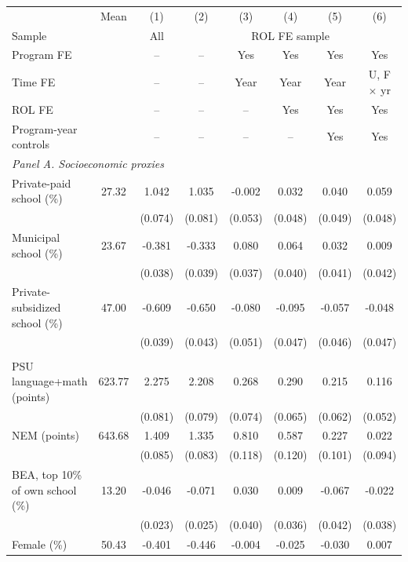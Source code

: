 \begin{tabular}{lc*{6}{c}}
\toprule
 & Mean & (1) & (2) & (3) & (4) & (5) & (6) \\
Sample & & All & \multicolumn{5}{c}{ROL FE sample} \\
Program FE & & -- & -- & Yes & Yes & Yes & Yes \\
Time FE & & -- & -- & Year & Year & Year & U, F \(\times\) yr \\
ROL FE & & -- & -- & -- & Yes & Yes & Yes \\
Program-year controls & & -- & -- & -- & -- & Yes & Yes \\
\midrule
\multicolumn{8}{l}{\textit{Panel A. Socioeconomic proxies}} \\
Private-paid school (\%) &  27.32 &  1.042\sym{***} &  1.035\sym{***} & -0.002 &  0.032 &  0.040 &  0.059 \\
 &  & (0.074) & (0.081) & (0.053) & (0.048) & (0.049) & (0.048) \\
Municipal school (\%) &  23.67 & -0.381\sym{***} & -0.333\sym{***} &  0.080\sym{**} &  0.064 &  0.032 &  0.009 \\
 &  & (0.038) & (0.039) & (0.037) & (0.040) & (0.041) & (0.042) \\
Private-subsidized school (\%) &  47.00 & -0.609\sym{***} & -0.650\sym{***} & -0.080 & -0.095\sym{**} & -0.057 & -0.048 \\
 &  & (0.039) & (0.043) & (0.051) & (0.047) & (0.046) & (0.047) \\
\addlinespace
\multicolumn{8}{l}{\textit{Panel B. Achievement and other predetermined}} \\
PSU language+math (points) & 623.77 &  2.275\sym{***} &  2.208\sym{***} &  0.268\sym{***} &  0.290\sym{***} &  0.215\sym{***} &  0.116\sym{**} \\
 &  & (0.081) & (0.079) & (0.074) & (0.065) & (0.062) & (0.052) \\
NEM (points) & 643.68 &  1.409\sym{***} &  1.335\sym{***} &  0.810\sym{***} &  0.587\sym{***} &  0.227\sym{**} &  0.022 \\
 &  & (0.085) & (0.083) & (0.118) & (0.120) & (0.101) & (0.094) \\
BEA, top 10\% of own school (\%) &  13.20 & -0.046\sym{**} & -0.071\sym{***} &  0.030 &  0.009 & -0.067 & -0.022 \\
 &  & (0.023) & (0.025) & (0.040) & (0.036) & (0.042) & (0.038) \\
Female (\%) &  50.43 & -0.401\sym{***} & -0.446\sym{***} & -0.004 & -0.025 & -0.030 &  0.007 \\

\end{tabular}
